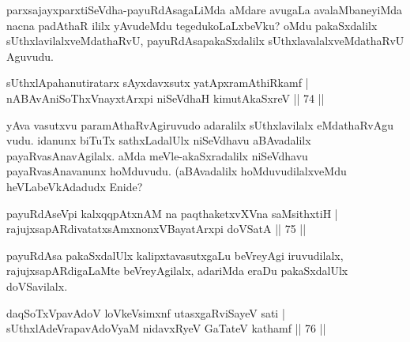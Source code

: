\begin{artha}
parxsajayxparxtiSeVdha-payuRdAsagaLiMda aMdare avugaLa avalaMbaneyiMda nacna padAthaR ililx yAvudeMdu tegedukoLaLxbeVku? oMdu pakaSxdalilx sUthxlavilalxveMdathaRvU, payuRdAsapakaSxdalilx sUthxlavalalxveMdathaRvU Aguvudu.
\end{artha}


\begin{shl}
sUthxlApahanutiratarx sAyxdavxsutx yatApxramAthiRkamf |\\
nABAvAniSoThxV\s nayxtArxpi niSeVdhaH kimutAkaSxreV \hfill || 74 ||
\end{shl}

\begin{artha}
yAva vasutxvu paramAthaRvAgiruvudo adaralilx sUthxlavilalx eMdathaRvAgu	vudu. idanunx biTuTx sathxLadalUlx niSeVdhavu aBAvadalilx payaRvasAnavAgilalx. aMda meVle-akaSxradalilx niSeVdhavu payaRvasAnavanunx hoMduvudu. (aBAvadalilx hoMduvudilalxveMdu heVLabeVkAdadudx Enide?
\end{artha}

\begin{shl}
payuRdAseV\s pi kalxqqpAtxnAM na paqthaketxvXVna saMsithxtiH |\\
rajujxsapARdivatatxsAmxnonxVBayatArxpi doVSatA \hfill || 75 ||
\end{shl}

\begin{artha}%
payuRdAsa pakaSxdalUlx kalipxtavasutxgaLu beVreyAgi iruvudilalx, rajujxsapARdigaLaMte beVreyAgilalx, adariMda eraDu pakaSxdalUlx doVSavilalx.
\end{artha}


\begin{shl}
daqSoTxV\s pavAdoV loVkeV\s simxnf \footnotemark[1]{}utasxgaRviSayeV sati |\\
sUthxlAdeVrapavAdoV\s yaM nidavxRyeV GaTateV kathamf \hfill || 76 ||
\end{shl}

